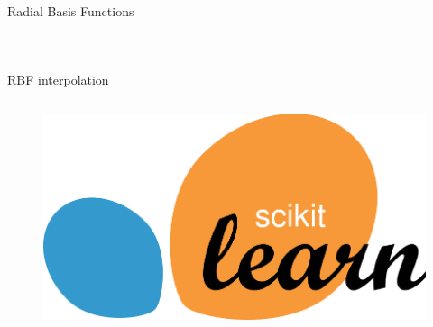 \begin{frame}{Radial Basis Functions}
\begin{columns}
\begin{figure}
        \end{figure}
    \end{columns}
\end{frame}



\begin{frame}{RBF interpolation}
    \vspace{-0.8cm}
    \begin{columns}
        
        
    \end{columns}
    \vspace{-0.8cm}
    \begin{columns}
        
        \vspace{0.8cm}
        \begin{figure}
            \centering
            \includegraphics[scale=0.5]{./images/scikitLogo.png}
        \end{figure}
    \end{columns}
\end{frame}

